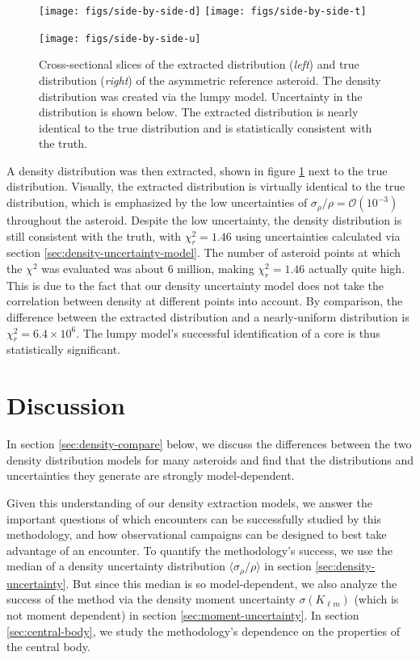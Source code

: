 \documentclass[fleqn,usenatbib]{mnras}
\begin{document}
\begin{figure}
  \centering
  \texttt{[image: figs/side-by-side-d]}\hfill
  \texttt{[image: figs/side-by-side-t]}

  \texttt{[image: figs/side-by-side-u]}
  \caption{Cross-sectional slices of the extracted distribution (\textit{left}) and true distribution (\textit{right}) of the asymmetric reference asteroid. The density distribution was created via the lumpy model. Uncertainty in the distribution is shown below. The extracted distribution is nearly identical to the true distribution and is statistically consistent with the truth.}
  \label{fig:den-side-by-side}
\end{figure}

A density distribution was then extracted, shown in figure \ref{fig:den-side-by-side} next to the true distribution. Visually, the extracted distribution is virtually identical to the true distribution, which is emphasized by the low uncertainties of $\sigma_\rho / \rho = \mathcal{O}(10^{-3})$ throughout the asteroid. Despite the low uncertainty, the density distribution is still consistent with the truth, with $\chi^2_r = 1.46$ using uncertainties calculated via section \ref{sec:density-uncertainty-model}. The number of asteroid points at which the $\chi^2$ was evaluated was about 6 million, making $\chi^2_r = 1.46$ actually quite high. This is due to the fact that our density uncertainty model does not take the correlation between density at different points into account. By comparison, the difference between the extracted distribution and a nearly-uniform distribution is $\chi^2_r = 6.4 \times 10^{6}$. The lumpy model's successful identification of a core is thus statistically significant.



\section{Discussion}
\label{sec:discussion}
In section \ref{sec:density-compare} below, we discuss the differences between the two density distribution models for many asteroids and find that the distributions and uncertainties they generate are strongly model-dependent.

Given this understanding of our density extraction models, we answer the important questions of which encounters can be successfully studied by this methodology, and how observational campaigns can be designed to best take advantage of an encounter. To quantify the methodology's success, we use the median of a density uncertainty distribution $\langle \sigma_\rho / \rho \rangle$ in section \ref{sec:density-uncertainty}. But since this median is so model-dependent, we also analyze the success of the method via the density moment uncertainty $\sigma (K_{\ell m})$ (which is not moment dependent) in section \ref{sec:moment-uncertainty}. In section \ref{sec:central-body}, we study the methodology's dependence on the properties of the central body.
\end{document}

